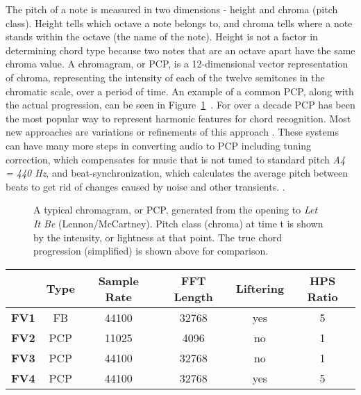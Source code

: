 \documentclass{sig-alternate}
\begin{document}
The pitch of a note is measured in two dimensions - height and chroma (pitch class). Height tells which octave a note belongs to, and chroma tells where a note stands within the octave (the name of the note). Height is not a factor in determining chord type because two notes that are an octave apart have the same chroma value. A chromagram, or PCP, is a 12-dimensional vector representation of chroma, representing the intensity of each of the twelve semitones in the chromatic scale, over a period of time. An example of a common PCP, along with the actual progression, can be seen in Figure~\ref{fig:fig4}~\cite{McVicar:2014}. For over a decade PCP has been the most popular way to represent harmonic features for chord recognition. Most new approaches are variations or refinements of this approach \cite{TaeMin:2014}. These systems can have many more steps in converting audio to PCP including tuning correction, which compensates for music that is not tuned to standard pitch \textit{A4 = 440 Hz}, and beat-synchronization, which calculates the average pitch between beats to get rid of changes caused by noise and other transients. \cite{McVicar:2014}.


\begin{figure}
\centering
{}
\caption{A typical chromagram, or PCP, generated from the opening to \textit{Let It Be} (Lennon/McCartney). Pitch class (chroma) at time t is shown by the intensity, or lightness at that point. The true chord progression (simplified) is shown above for comparison.}
\label{fig:fig4}
\end{figure}

\begin{table*}
\centering
\begin{tabular}{|c|c|c|c|c|c|} \hline
 & \textbf{Type} & \textbf{Sample Rate} & \textbf{FFT Length} & \textbf{Liftering} & \textbf{HPS Ratio} \\ \hline
\textbf{FV1} & FB & 44100 & 32768 & yes & 5 \\ \hline
\textbf{FV2} & PCP & 11025 & 4096 & no & 1 \\ \hline
\textbf{FV3} & PCP & 44100 & 32768 & no & 1 \\ \hline
\textbf{FV4} & PCP & 44100 & 32768 & yes & 5 \\ \hline
\end{tabular}
\caption{Feature Vectors, or combinations of methods used for feature extraction, for isolated chord recognition in research case 1~\cite{Morman:2006}.}
\label{tab:tab2}
\end{table*} 
\end{document}
